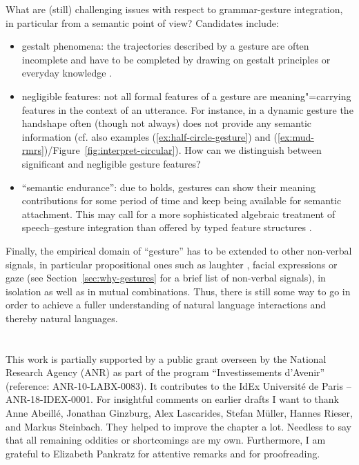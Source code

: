 \documentclass[output=paper,biblatex,babelshorthands,newtxmath,draftmode,colorlinks,citecolor=brown]{langscibook}
\begin{document}
What are (still) challenging issues with respect to grammar-gesture integration, in particular from a semantic point of view? Candidates include:

\begin{itemize}
\item gestalt phenomena: the trajectories described by a gesture are often incomplete and have to be completed by drawing on gestalt principles or everyday knowledge \citep{Luecking:2016}.
\item negligible features: not all formal features of a gesture are meaning"=carrying features in the context of an utterance. For instance, in a dynamic gesture the handshape often (though not always) does not provide any semantic information (cf. also examples (\ref{ex:half-circle-gesture}) and (\ref{ex:mud-rmrs})/Figure~\ref{fig:interpret-circular}). How can we distinguish between significant and negligible gesture features?
\item \enquote{semantic endurance}: due to holds, gestures can show their meaning contributions for some period of time and keep being available for semantic attachment. This may call for a more sophisticated algebraic treatment of speech--gesture integration than offered by typed feature structures \citep{Rieser:2015}.
\end{itemize}

\largerpage
Finally, the empirical domain of \enquote{gesture} has to be extended to other non-verbal signals, in particular propositional ones such as laughter \citep{Ginzburg:Breitholz:Cooper:Hough:Tian:2015}, facial expressions or gaze (see Section~\ref{sec:why-gestures} for a brief list of non-verbal signals), in isolation as well as in mutual combinations.
%
Thus, there is still some way to go in order to achieve a fuller understanding of natural language interactions and thereby natural languages.


 
\section*{\acknowledgmentsUS}


This work is partially supported by a public grant overseen by the  National Research Agency (ANR) as part of the program ``Investissements d'Avenir'' (reference: ANR-10-LABX-0083). It contributes to the IdEx Université de Paris -- ANR-18-IDEX-0001. For insightful comments on earlier drafts I want to thank Anne Abeillé, Jonathan Ginzburg, Alex Lascarides, Stefan Müller, Hannes Rieser, and Markus Steinbach. They helped to improve the chapter a lot. Needless to say that all remaining oddities or shortcomings are my own. Furthermore, I am grateful to Elizabeth Pankratz for attentive remarks and for proofreading. 



{\sloppy
\printbibliography[heading=subbibliography,notkeyword=this]
}
\end{document}
